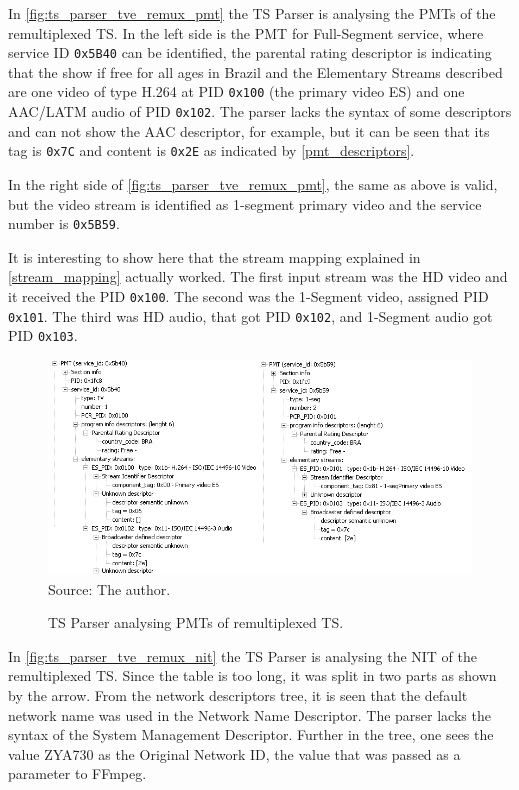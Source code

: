 \documentclass[12pt,a4paper]{article}
\begin{document}
In \autoref{fig:ts_parser_tve_remux_pmt} the TS Parser is analysing the PMTs of the remultiplexed TS. In the left side is the PMT for Full-Segment service, where service ID \texttt{0x5B40} can be identified, the parental rating descriptor is indicating that the show if free for all ages in Brazil and the Elementary Streams described are one video of type H.264 at PID \texttt{0x100} (the primary video ES) and one AAC/LATM audio of PID \texttt{0x102}. The parser lacks the syntax of some descriptors and can not show the AAC descriptor, for example, but it can be seen that its tag is \texttt{0x7C} and content is \texttt{0x2E} as indicated by \autoref{pmt_descriptors}.

In the right side of \autoref{fig:ts_parser_tve_remux_pmt}, the same as above is valid, but the video stream is identified as 1-segment primary video and the service number is \texttt{0x5B59}.

It is interesting to show here that the stream mapping explained in \autoref{stream_mapping} actually worked. The first input stream was the HD video and it received the PID \texttt{0x100}. The second was the 1-Segment video, assigned PID \texttt{0x101}. The third was HD audio, that got PID \texttt{0x102}, and 1-Segment audio got PID \texttt{0x103}.

\begin{figure}[!h]
\centering
\caption{TS Parser analysing PMTs of remultiplexed TS.}
\includegraphics[width=0.9\linewidth]{pictures/ts_parser_tve_remux_pmt.png}
\\Source: The author.
\label{fig:ts_parser_tve_remux_pmt}
\end{figure}

In \autoref{fig:ts_parser_tve_remux_nit} the TS Parser is analysing the NIT of the remultiplexed TS. Since the table is too long, it was split in two parts as shown by the arrow. From the network descriptors tree, it is seen that the default network name was used in the Network Name Descriptor. The parser lacks the syntax of the System Management Descriptor. Further in the tree, one sees the value ZYA730 as the Original Network ID, the value that was passed as a parameter to FFmpeg.
\end{document}
